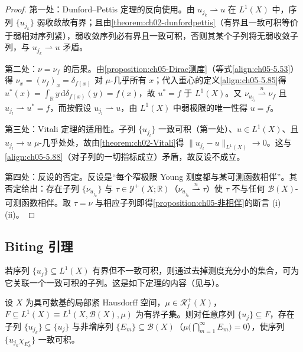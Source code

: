 \documentclass[../../main.tex]{subfiles}
\begin{document}
\begin{proof}
第一处：Dunford--Pettis 定理的反向使用。由 $u_{j_k}\rightharpoonup u$ 在 $L^1(X)$ 中，序列 $\{u_{j_k}\}$ 弱收敛故有界；且由\cref{theorem:ch02-dunfordpettis}（有界且一致可积等价于弱相对序列紧），弱收敛序列必有界且一致可积，否则其某个子列将无弱收敛子列，与 $u_{j_k}\rightharpoonup u$ 矛盾。

第二处：$\nu=\nu_f$ 的后果。由\cref{proposition:ch05-Dirac测度}（等式\eqref{align:ch05-5.53}）得 $\nu_x=(\nu_f)_x=\delta_{f(x)}$ 对 $\mu$-几乎所有 $x$；代入重心的定义\eqref{align:ch05-5.85}得 $u^*(x)=\int_{\mathbb{R}}y\,\mathrm{d}\delta_{f(x)}(y)=f(x)$，故 $u^*=f$ 于 $L^1(X)$。又 $\nu_{u_{j_l}}\stackrel{n}{\rightharpoonup}\nu_f$ 且 $u_{j_l}\rightharpoonup u^*=f$，而按假设 $u_{j_l}\rightharpoonup u$，由 $L^1(X)$ 中弱极限的唯一性得 $u=f$。

第三处：Vitali 定理的适用性。子列 $\{u_{j_l}\}$ 一致可积（第一处）、$u\in L^1(X)$、且 $u_{j_l}\to u$ $\mu$-几乎处处，故由\cref{theorem:ch02-Vitali}得 $\|u_{j_l}-u\|_{L^1(X)}\to0$。这与\eqref{align:ch05-5.88}（对子列的一切指标成立）矛盾，故反设不成立。

第四处：反设的否定。反设是“每个窄极限 Young 测度都与某可测函数相伴”。其否定给出：存在子列 $\{\nu_{u_{j_k}}\}$ 与 $\tau\in\mathcal{Y}^+(X;\mathbb{R})$（$\nu_{u_{j_k}}\stackrel{n}{\rightharpoonup}\tau$）使 $\tau$ 不与任何 $\mathscr{B}(X)$-可测函数相伴。取 $\tau=\nu$ 与相应子列即得\cref{proposition:ch05-非相伴}的断言 (i)(ii)。
\end{proof}

\subsection{Biting 引理}\label{subsection:ch05-Biting}

若序列 $\{u_j\}\subseteq L^1(X)$ 有界但不一致可积，则通过去掉测度充分小的集合，可为它关联一个一致可积的子列。这是如下定理的内容（见\cite[Theorem 6.6]{ref78}与\cite[Theorem 23]{ref103}）。

\begin{theorem}[Biting 引理]\label{theorem:ch05-biting定理}
设 $X$ 为具可数基的局部紧 Hausdorff 空间，$\mu\in\mathscr{R}^+_f(X)$，$F\subseteq L^1(X)\equiv L^1(X,\mathscr{B}(X),\mu)$ 为有界子集。则对任意序列 $\{u_j\}\subseteq F$，存在子列 $\{u_{j_k}\}\subseteq\{u_j\}$ 与非增序列 $\{E_m\}\subseteq\mathscr{B}(X)$（$\mu\big(\bigcap_{m=1}^\infty E_m\big)=0$），使序列 $\{u_{j_k}\chi_{E_k^c}\}$ 一致可积。
\end{theorem}
\end{document}
